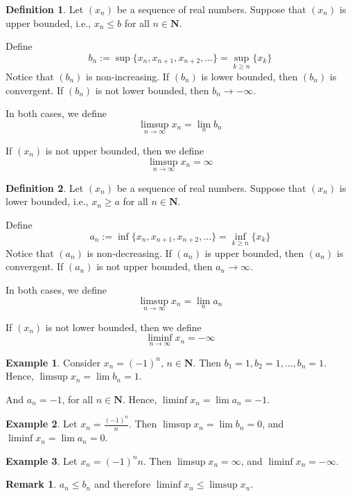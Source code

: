 \documentclass[12pt,a4paper]{article}
\theoremstyle{definition}
\newtheorem{remark}[theorem]{Remark}
\newtheorem{example}{Example}[section]
\newtheorem{definition}{Definition}[section]
\begin{document}
\begin{definition}
	Let $(x_n)$ be a sequence of real numbers. Suppose that $(x_n)$ is upper bounded, i.e., $x_n \leq b$ for all $n \in \textbf{N}$.
	
	Define
	\[
		b_n := \sup \{ x_n, x_{n+1}, x_{n+2}, \ldots \} = \sup_{k \geq n} \{ x_k \}
	\]
	Notice that $(b_n)$ is non-increasing. If $(b_n)$ is lower bounded, then $(b_n)$ is convergent. If $(b_n)$ is not lower bounded, then $b_n \longrightarrow - \infty$. 
	
	In both cases, we define \[ \limsup_{n \to \infty} x_n = \lim_n b_n \]
	
	If $(x_n)$ is not upper bounded, then we define \[ \limsup_{n \to \infty} x_n = \infty \]
\end{definition}

\begin{definition}
	Let $(x_n)$ be a sequence of real numbers. Suppose that $(x_n)$ is lower bounded, i.e., $x_n \geq a$ for all $n \in \textbf{N}$.
	
	Define
	\[
		a_n := \inf \{ x_n, x_{n+1}, x_{n+2}, \ldots \} = \inf_{k \geq n} \{ x_k \}
	\]
	Notice that $(a_n)$ is non-decreasing. If $(a_n)$ is upper bounded, then $(a_n)$ is convergent. If $(a_n)$ is not upper bounded, then $a_n \longrightarrow \infty$. 
	
	In both cases, we define \[ \limsup_{n \to \infty} x_n = \lim_n a_n \]
	
	If $(x_n)$ is not lower bounded, then we define \[ \liminf_{n \to \infty} x_n = - \infty \]
\end{definition}	

\begin{example}
	Consider $x_n = (-1)^n$, $n \in \textbf{N}$. Then $b_1 = 1, b_2 = 1, \ldots, b_n = 1$. Hence, $\limsup x_n = \lim b_n = 1$.
	
	And $a_n = -1$, for all $n \in \textbf{N}$. Hence, $\liminf x_n = \lim a_n = -1$.
\end{example}

\begin{example}
	Let $x_n = \frac{(-1)^n}{n}$. Then $\limsup x_n = \lim b_n = 0$, and $\liminf x_n = \lim a_n = 0$.
\end{example}

\begin{example}
	Let $x_n = (-1)^n n$. Then $\limsup x_n = \infty$, and $\liminf x_n = - \infty$.
\end{example}

\begin{remark}
	$a_n \leq b_n$ and therefore $\liminf x_n \leq \limsup x_n$.
\end{remark}
\end{document}
